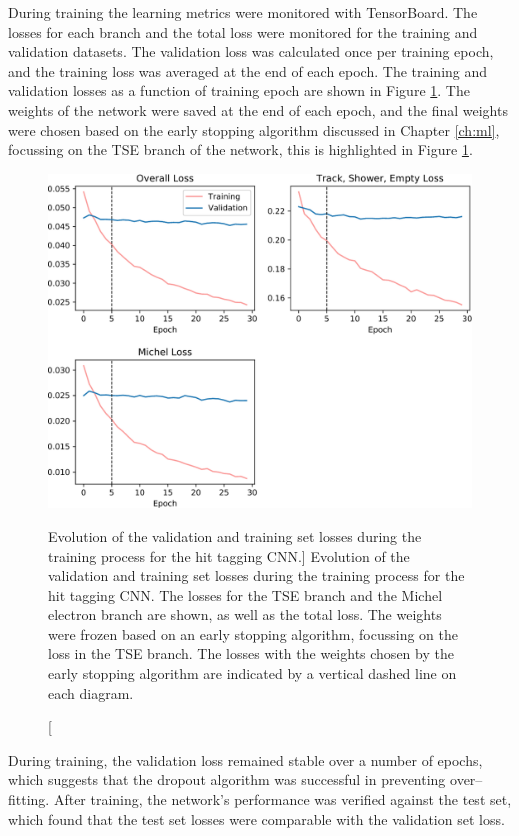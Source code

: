 During training the learning metrics were monitored with TensorBoard. The
losses for each branch and the total loss were monitored for the training
and validation datasets. The validation loss was calculated once per training
epoch, and the training loss was averaged at the end of each epoch. The 
training and validation losses as a function of training epoch are shown in 
Figure \ref{fig:training}. The weights of the network were saved at the end 
of each epoch, and the final weights were chosen based on the early stopping 
algorithm discussed in Chapter \ref{ch:ml}, focussing on the TSE branch of the 
network, this is highlighted in Figure \ref{fig:training}.
\begin{figure}
	\centering
	\includegraphics[width=\textwidth]{figures/losses_prelu.pdf}
	\caption
	[Evolution of the validation and training set losses during the training 
	process for the hit tagging CNN.]
	{Evolution of the validation and training set losses during the training 
	process for the hit tagging CNN. The losses for the TSE branch and the Michel 
	electron branch are shown, as well as the total loss. The weights were frozen 
	based on an early stopping algorithm, focussing on the loss in the TSE 
	branch. The losses with the weights chosen by the early stopping algorithm 
	are indicated by a vertical dashed line on each diagram.} 
	\label{fig:training}
\end{figure}

During training, the validation loss remained stable over a number of epochs,
which suggests that the dropout algorithm was successful in preventing 
over--fitting. After training, the network's performance was verified against 
the test set, which found that the test set losses were comparable with the 
validation set loss. 

